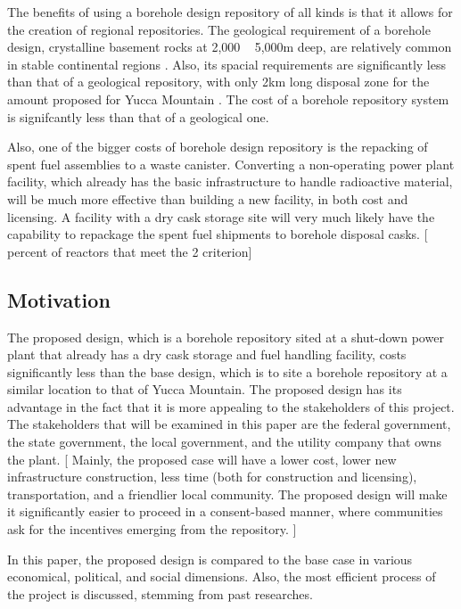\documentclass{anstrans}
\begin{document}
The benefits of using a borehole design repository of all kinds is that it 
allows for the creation of regional repositories. The geological requirement of 
a borehole design, crystalline basement rocks at 2,000 ~ 5,000m deep, are 
relatively common in stable continental regions \cite{arnold_research_2012}.  
Also, its spacial requirements are significantly less than that of a geological 
repository, with only 2km long disposal zone for the amount proposed for Yucca 
Mountain \cite{brady_deep_2009}. The cost of a borehole repository system is 
signifcantly less than that of a geological one. 

Also, one of the bigger costs of borehole design repository is the repacking of 
spent fuel assemblies to a waste canister. Converting a non-operating power 
plant facility, which already has the basic infrastructure to handle 
radioactive material, will be much more effective than building a new facility, 
in both cost and licensing. A facility with a dry cask storage site will very 
much likely have the capability to repackage the spent fuel shipments to 
borehole disposal casks. [ percent of reactors that meet the 2 criterion]

\subsection{Motivation}

The proposed design, which is a borehole repository sited at a shut-down power
plant that already has a dry cask storage and fuel handling facility, costs 
significantly less than the base design, which is to site a borehole repository 
at a similar location to that of Yucca Mountain. The proposed design has its 
advantage in the fact that it is more appealing to the stakeholders of this 
project. The stakeholders that will be examined in this paper are the federal 
government, the state government, the local government, and the utility company 
that owns the plant.
[ Mainly, the proposed case will have a lower cost, lower new infrastructure 
construction, less time (both for construction and licensing), transportation, 
and a friendlier local community. The proposed design will make it 
significantly easier to proceed in a consent-based manner, where communities 
ask for the incentives emerging from the repository. ] 

In this paper, the proposed design is compared to the base case in various 
economical, political, and social dimensions. Also, the most efficient process 
of the project is discussed, stemming from past researches. 
\end{document}
